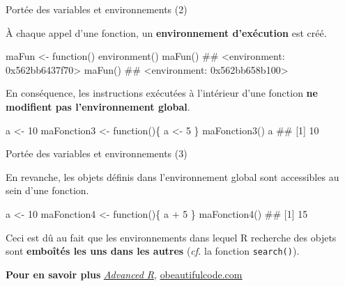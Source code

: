 \documentclass[12pt,ignorenonframetext,]{beamer}
\newenvironment{Shaded}{}{}
\newcommand{\KeywordTok}[1]{\textcolor[rgb]{0.00,0.00,1.00}{#1}}
\newcommand{\DecValTok}[1]{#1}
\newcommand{\StringTok}[1]{\textcolor[rgb]{0.00,0.50,0.50}{#1}}
\newcommand{\ControlFlowTok}[1]{\textcolor[rgb]{0.00,0.00,1.00}{#1}}
\newcommand{\OperatorTok}[1]{#1}
\newcommand{\NormalTok}[1]{#1}
\renewenvironment{Shaded}{\begin{snugshade}}{\end{snugshade}}
\newcommand{\intertitre}[1]{\textcolor{redInsee}{\textbf{#1}}}
\begin{document}
\begin{frame}[fragile]{\large Portée des variables et environnements
(2)}

\small
À chaque appel d'une fonction, un \textbf{environnement d'exécution} est
créé.

\footnotesize

\begin{Shaded}
\begin{Highlighting}[]
\NormalTok{maFun <-}\StringTok{ }\ControlFlowTok{function}\NormalTok{() }\KeywordTok{environment}\NormalTok{()}
\KeywordTok{maFun}\NormalTok{()}
\NormalTok{  ## <environment: 0x562bb6437f70>}
\KeywordTok{maFun}\NormalTok{()}
\NormalTok{  ## <environment: 0x562bb658b100>}
\end{Highlighting}
\end{Shaded}

\pause \small
En conséquence, les instructions exécutées à l'intérieur d'une fonction
\textbf{ne modifient pas l'environnement global}.

\footnotesize

\begin{Shaded}
\begin{Highlighting}[]
\NormalTok{a <-}\StringTok{ }\DecValTok{10}
\NormalTok{maFonction3 <-}\StringTok{ }\ControlFlowTok{function}\NormalTok{()\{}
\NormalTok{  a <-}\StringTok{ }\DecValTok{5}
\NormalTok{\}}
\KeywordTok{maFonction3}\NormalTok{()}
\NormalTok{a}
\NormalTok{  ## [1] 10}
\end{Highlighting}
\end{Shaded}

\end{frame}

\begin{frame}[fragile]{\large Portée des variables et environnements
(3)}

En revanche, les objets définis dans l'environnement global sont
accessibles au sein d'une fonction.

\footnotesize

\begin{Shaded}
\begin{Highlighting}[]
\NormalTok{a <-}\StringTok{ }\DecValTok{10}
\NormalTok{maFonction4 <-}\StringTok{ }\ControlFlowTok{function}\NormalTok{()\{}
\NormalTok{  a }\OperatorTok{+}\StringTok{ }\DecValTok{5}
\NormalTok{\}}
\KeywordTok{maFonction4}\NormalTok{()}
\NormalTok{  ## [1] 15}
\end{Highlighting}
\end{Shaded}

\pause \normalsize
Ceci est dû au fait que les environnements dans lequel R recherche des
objets sont \textbf{emboîtés les uns dans les autres} (\textit{cf.} la
fonction \texttt{search()}).

\intertitre{Pour en savoir plus}
\href{http://adv-r.had.co.nz/Environments.html\#function-envs}{\underline{\textit{Advanced R}}},
\href{http://blog.obeautifulcode.com/R/How-R-Searches-And-Finds-Stuff/}{\underline{obeautifulcode.com}}

\end{frame}
\end{document}
